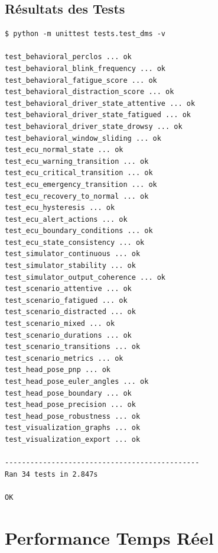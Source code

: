 \documentclass[12pt,a4paper,twoside]{report}
\begin{document}
\subsection{Résultats des Tests}

\begin{lstlisting}[style=pythonstyle, caption={Résultat de l'exécution des tests unitaires.}, label={lst:test_results}, language={}]
$ python -m unittest tests.test_dms -v

test_behavioral_perclos ... ok
test_behavioral_blink_frequency ... ok
test_behavioral_fatigue_score ... ok
test_behavioral_distraction_score ... ok
test_behavioral_driver_state_attentive ... ok
test_behavioral_driver_state_fatigued ... ok
test_behavioral_driver_state_drowsy ... ok
test_behavioral_window_sliding ... ok
test_ecu_normal_state ... ok
test_ecu_warning_transition ... ok
test_ecu_critical_transition ... ok
test_ecu_emergency_transition ... ok
test_ecu_recovery_to_normal ... ok
test_ecu_hysteresis ... ok
test_ecu_alert_actions ... ok
test_ecu_boundary_conditions ... ok
test_ecu_state_consistency ... ok
test_simulator_continuous ... ok
test_simulator_stability ... ok
test_simulator_output_coherence ... ok
test_scenario_attentive ... ok
test_scenario_fatigued ... ok
test_scenario_distracted ... ok
test_scenario_mixed ... ok
test_scenario_durations ... ok
test_scenario_transitions ... ok
test_scenario_metrics ... ok
test_head_pose_pnp ... ok
test_head_pose_euler_angles ... ok
test_head_pose_boundary ... ok
test_head_pose_precision ... ok
test_head_pose_robustness ... ok
test_visualization_graphs ... ok
test_visualization_export ... ok

----------------------------------------------
Ran 34 tests in 2.847s

OK
\end{lstlisting}

\section{Performance Temps Réel}
\end{document}
